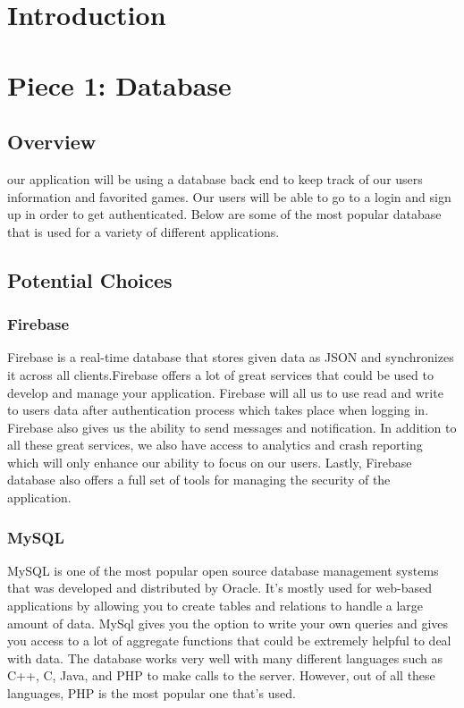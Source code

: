 \documentclass[onecolumn, draftclsnofoot,10pt, compsoc]{IEEEtran}
\begin{document}
\newpage
{}
\tableofcontents
\clearpage

\section{Introduction}
\section{Piece 1: Database}
\subsection{Overview}
\par our application will be using a database back end to keep track of our users information and favorited games. Our users will be able to go to a login and sign up in order to get authenticated. Below are some of the most popular database that is used for a variety of different applications. 
\subsection{Potential Choices}

\subsubsection{Firebase}
Firebase is a real-time database that stores given data as JSON and synchronizes it across all clients.Firebase offers a lot of great services that could be used to develop and manage your application. Firebase will all us to use read and write to users data after authentication process which takes place when logging in. Firebase also gives us the ability to send messages and notification. In addition to all these great services, we also have access to analytics and crash reporting which will only enhance our ability to focus on our users. Lastly, Firebase database also offers a full set of tools for managing the security of the application.

\subsubsection{MySQL}
MySQL is one of the most popular open source database management systems that was developed and distributed by Oracle. It's mostly used for web-based applications by allowing you to create tables and relations to handle a large amount of data. MySql gives you the option to write your own queries and gives you access to a lot of aggregate functions that could be extremely helpful to deal with data. The database works very well with many different languages such as C++, C, Java, and PHP to make calls to the server. However, out of all these languages, PHP is the most popular one that's used.
\end{document}
